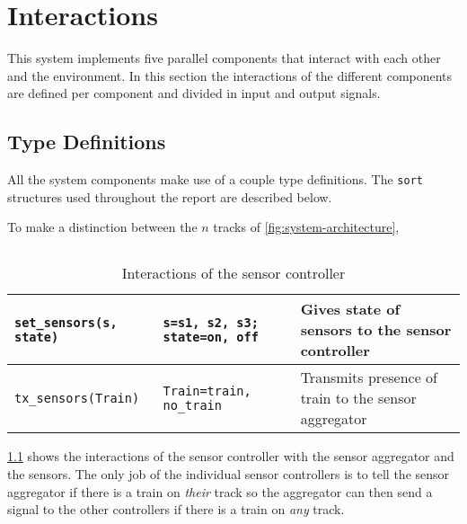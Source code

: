 \documentclass[final]{report}
\begin{document}
\chapter{Interactions}\label{ch:interactions}
This system implements five parallel components that interact with each other and the environment.
In this section the interactions of the different components are defined per component and divided in input and output signals.

\section{Type Definitions}\label{sec:interactions-typedef}
All the system components make use of a couple type definitions.
The \texttt{sort} structures used throughout the report are described below.

To make a distinction between the $n$ tracks of \cref{fig:system-architecture}, 

\section{}
\begin{table}[H]
\centering
    \begin{tabular}{|l|l|l|}
    \hline
    \texttt{set\_sensors(s, state)} & \texttt{s=s1, s2, s3; state=on, off}  & Gives state of sensors to the sensor controller      \\ \hline
    \texttt{tx\_sensors(Train)}     & \texttt{Train=train, no\_train}       & Transmits presence of train to the sensor aggregator \\ \hline
    \end{tabular}
    \caption{Interactions of the sensor controller}
    \label{tab:sensorSignals}
\end{table}

\cref{tab:sensorSignals} shows the interactions of the sensor controller with the sensor aggregator and the sensors.
The only job of the individual sensor controllers is to tell the sensor aggregator if there is a train on \textit{their} track so the aggregator can then send a signal to the other controllers if there is a train on \textit{any} track.
\end{document}
